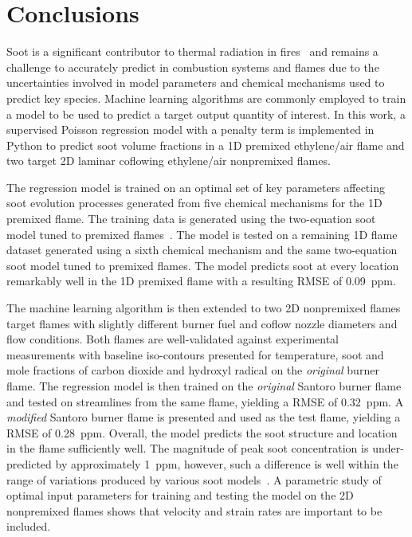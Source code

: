 \documentclass[12pt]{CHT-20}
\begin{document}
\section{Conclusions} \label{sec:conclusion}

Soot is a significant contributor to thermal radiation in fires~\citep[]{Beji2008} and remains a challenge to accurately predict in combustion systems and flames due to the uncertainties involved in model parameters and chemical mechanisms used to predict key species. Machine learning algorithms are commonly employed to train a model to be used to predict a target output quantity of interest. In this work, a supervised Poisson regression model with a penalty term is implemented in Python to predict soot volume fractions in a 1D premixed ethylene/air flame and two target 2D laminar coflowing ethylene/air nonpremixed flames. 

The regression model is trained on an optimal set of key parameters affecting soot evolution processes generated from five chemical mechanisms for the 1D premixed flame. The training data is generated using the two-equation soot model tuned to premixed flames~\citep[]{Roy}. The model is tested on a remaining 1D flame dataset generated using a sixth chemical mechanism and the same two-equation soot model tuned to premixed flames. The model predicts soot at every location remarkably well in the 1D premixed flame with a resulting RMSE of 0.09~ppm.

The machine learning algorithm is then extended to two 2D nonpremixed flames target flames with slightly different burner fuel and coflow nozzle diameters and flow conditions. Both flames are well-validated against experimental measurements with baseline iso-contours presented for temperature, soot and mole fractions of carbon dioxide and hydroxyl radical on the \emph{original} burner flame. The regression model is then trained on the \emph{original} Santoro burner flame and tested on streamlines from the same flame, yielding a RMSE of 0.32~ppm. A \emph{modified} Santoro burner flame is presented and used as the test flame, yielding a RMSE of 0.28~ppm. Overall, the model predicts the soot structure and location in the flame sufficiently well. The magnitude of peak soot concentration is under-predicted by approximately 1~ppm, however, such a difference is well within the range of variations produced by various soot models~\citep[]{Dasgupta2015}. A parametric study of optimal input parameters for training and testing the model on the 2D nonpremixed flames shows that velocity and strain rates are important to be included.
\end{document}
